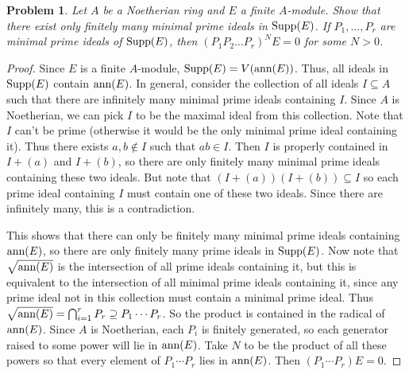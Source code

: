 \documentclass{article}
\newcommand{\supp}{\textup{Supp}}
\newcommand{\ann}{\textup{ann}}
\newtheorem{problem}{Problem}
\begin{document}
\begin{problem}
Let $A$ be a Noetherian ring and $E$ a finite $A$-module. Show that there exist only finitely many minimal prime ideals in $\supp(E)$. If $P_1, \dots, P_r$ are minimal prime ideals of $\supp(E)$, then $(P_1 P_2 \dots P_r)^N E = 0$ for some $N > 0$.
\end{problem}
\begin{proof}
Since $E$ is a finite $A$-module, $\supp(E) = V(\ann(E))$. Thus, all ideals in $\supp(E)$ contain $\ann(E)$. In general, consider the collection of all ideals $I \subseteq A$ such that there are infinitely many minimal prime ideals containing $I$. Since $A$ is Noetherian, we can pick $I$ to be the maximal ideal from this collection. Note that $I$ can't be prime (otherwise it would be the only minimal prime ideal containing it). Thus there exists $a,b \notin I$ such that $ab \in I$. Then $I$ is properly contained in $I + (a)$ and $I + (b)$, so there are only finitely many minimal prime ideals containing these two ideals. But note that $(I + (a))(I + (b)) \subseteq I$ so each prime ideal containing $I$ must contain one of these two ideals. Since there are infinitely many, this is a contradiction.

This shows that there can only be finitely many minimal prime ideals containing $\ann(E)$, so there are only finitely many prime ideals in $\supp(E)$. Now note that $\sqrt{\ann(E)}$ is the intersection of all prime ideals containing it, but this is equivalent to the intersection of all minimal prime ideals containing it, since any prime ideal not in this collection must contain a minimal prime ideal. Thus $\sqrt{\ann(E)} = \bigcap_{i=1}^r P_r \supseteq P_1 \cdots P_r$. So the product is contained in the radical of $\ann(E)$. Since $A$ is Noetherian, each $P_i$ is finitely generated, so each generator raised to some power will lie in $\ann(E)$. Take $N$ to be the product of all these powers so that every element of $P_1 \cdots P_r$ lies in $\ann(E)$. Then $(P_1 \cdots P_r)E = 0$.
\end{proof}
\end{document}
